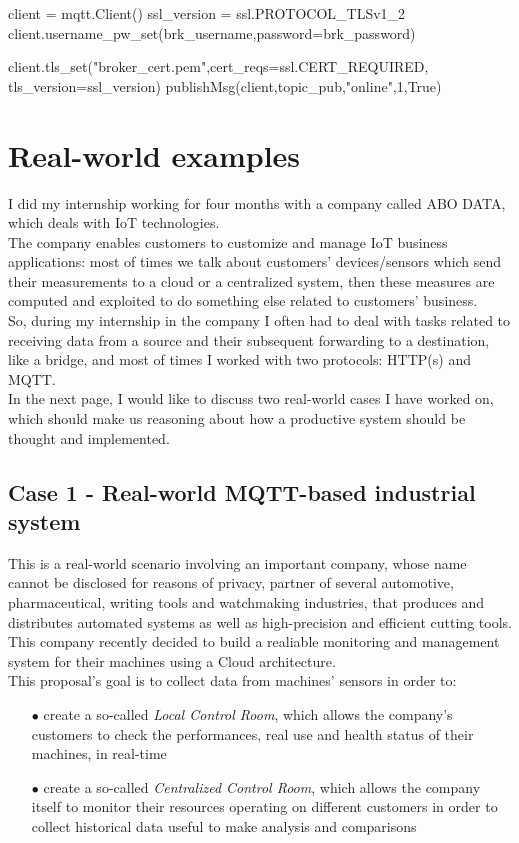\documentclass[12pt]{report}
\begin{document}
{{\begin{python}
client = mqtt.Client()
ssl_version = ssl.PROTOCOL_TLSv1_2
client.username_pw_set(brk_username,password=brk_password)

client.tls_set("broker_cert.pem",cert_reqs=ssl.CERT_REQUIRED,  tls_version=ssl_version)
publishMsg(client,topic_pub,"online",1,True)
\end{python}


\chapter{Real-world examples}
\bigskip
I did my internship working for four months with a company called ABO DATA, which deals with IoT technologies.\\
The company enables customers to customize and manage IoT business applications: most of times we talk about customers' devices/sensors which send their measurements to a cloud or a centralized system, then these measures are computed and exploited to do something else related to customers' business.\\
So, during my internship in the company I often had to deal with tasks related to receiving data from a source and their subsequent forwarding to a destination, like a bridge, and most of times I worked with two protocols: HTTP(s) and MQTT.\\

In the next page, I would like to discuss two real-world cases I have worked on, which should make us reasoning about how a productive system should be thought and implemented.\\

\clearpage
\section{Case 1 - Real-world MQTT-based industrial system}
\bigskip
This is a real-world scenario involving an important company, whose name cannot be disclosed for reasons of privacy, partner of several automotive, pharmaceutical, writing tools and watchmaking industries, that produces and distributes automated systems as well as high-precision and efficient cutting tools.\\

This company recently decided to build a realiable monitoring and management system for their machines using a Cloud architecture.\\
This proposal's goal is to collect data from machines' sensors in order to:

\begin{itemize}
\setlength{\itemindent}{+4mm}
\item[$\bullet$] create a so-called \emph{Local Control Room}, which allows the company's customers to check the performances, real use and health status of their machines, in real-time
\item[$\bullet$] create a so-called \emph{Centralized Control Room}, which allows the company itself to monitor their resources operating on different customers in order to collect historical data useful to make analysis and comparisons
\end{itemize}

}}
\end{document}
